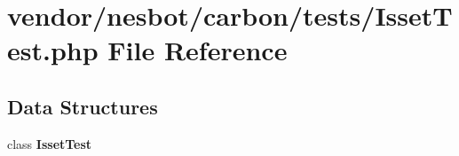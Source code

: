 \section{vendor/nesbot/carbon/tests/\+Isset\+Test.php File Reference}
\label{_isset_test_8php}
\subsection*{Data Structures}
\begin{DoxyCompactItemize}
\item 
class {\bf Isset\+Test}
\end{DoxyCompactItemize}
